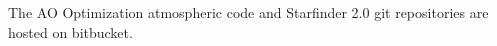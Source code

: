 The AO Optimization atmospheric code and Starfinder 2.0 git repositories are hosted on bitbucket. 
\label{fig:diss_git_repos}
  